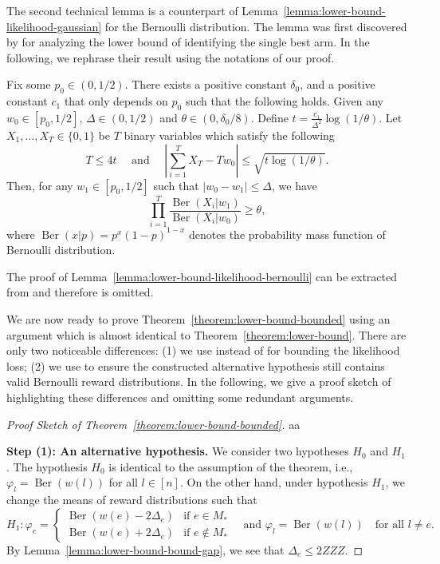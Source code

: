 \documentclass{article}
\newcommand{\Rew}{\varphi}
\DeclareMathOperator{\Ber}{Ber}
\begin{document}
{The second technical lemma is a counterpart of Lemma~\ref{lemma:lower-bound-likelihood-gaussian} for the Bernoulli distribution.
The lemma was first discovered by \citet{mannor2004sample} for analyzing the lower bound of identifying the single best arm.
In the following, we rephrase their result using the notations of our proof.
\begin{lemma}
\label{lemma:lower-bound-likelihood-bernoulli}
Fix some $p_0 \in (0,1/2)$. 
There exists a positive constant $\delta_0$, and a positive constant $c_1$ that only depends on $p_0$ such that the following holds.
Given any $w_0 \in [p_0, 1/2]$, $\Delta \in (0,1/2)$ and $\theta \in (0, \delta_0/8)$.
Define $t= \frac{c_1}{\Delta^2}\log(1/\theta)$.
Let $X_1,\ldots, X_T \in \{0,1\}$ be $T$ binary variables which satisfy the following
\begin{equation}
\label{eq:lemma:lower-bound-likelihood-gaussian}
T \le 4t \quad\text{ and }\quad \left|\sum_{i=1}^T X_T -  Tw_0 \right| \le \sqrt{t\log(1/\theta)}.
\end{equation}
Then, for any $w_1 \in [p_0, 1/2]$ such that $|w_0-w_1| \le \Delta$, we have
$$
\prod_{i=1}^T \frac{\Ber(X_i | w_1)}{\Ber(X_i | w_0)} \ge \theta,
$$
where $\Ber(x | p) = p^{x}(1-p)^{1-x}$ denotes the probability mass function of Bernoulli distribution.
\end{lemma}
The proof of Lemma~\ref{lemma:lower-bound-likelihood-bernoulli} can be extracted from \citep[Theorem~4]{mannor2004sample} and therefore is omitted.

We are now ready to prove Theorem~\ref{theorem:lower-bound-bounded} using an argument which is almost identical to Theorem~\ref{theorem:lower-bound}. 
There are only two noticeable differences: (1) we use  instead of  for bounding the likelihood loss; (2) we use  to ensure the constructed alternative hypothesis still contains valid Bernoulli reward distributions.
In the following, we give a proof sketch of  highlighting these differences and omitting some redundant arguments.
\begin{proof}[Proof Sketch of Theorem~\ref{theorem:lower-bound-bounded}]

aa


\textbf{Step (1): An alternative hypothesis.}
We consider two hypotheses $H_0$ and $H_1$. 
The hypothesis $H_0$ is identical to the assumption of the theorem, i.e., $\Rew_l = \Ber(w(l))$ for all $l\in [n]$.
On the other hand, under hypothesis $H_1$, we change the means of reward distributions such that 
$$
H_1: 
	\Rew_e = \begin{cases}
	\Ber(w(e)-2\Delta_e) & \text{if } e\in M_*\\
	\Ber(w(e)+2\Delta_e) & \text{if } e\not\in M_*
\end{cases} 
\quad\text{and } \Rew_l=\Ber(w(l)) \quad\text{for all } l\not = e.
$$
By Lemma~\ref{lemma:lower-bound-bound-gap}, we see that 
$\Delta_e \le 2ZZZ$.

\end{proof}
}
\end{document}
